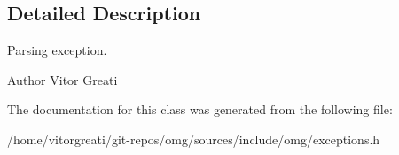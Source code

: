 \subsection{Detailed Description}
Parsing exception. 

\begin{DoxyAuthor}{Author}
Vitor Greati 
\end{DoxyAuthor}


The documentation for this class was generated from the following file\+:\begin{DoxyCompactItemize}
\item 
/home/vitorgreati/git-\/repos/omg/sources/include/omg/exceptions.\+h\end{DoxyCompactItemize}
